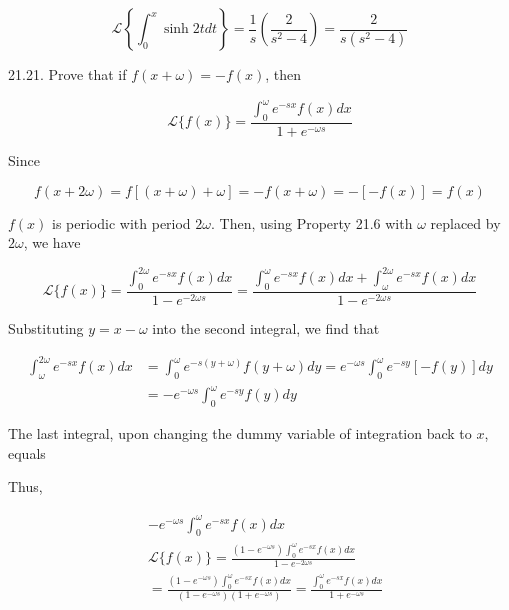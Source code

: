 \documentclass[10pt]{article}
\begin{document}
$$
\mathscr{L}\left\{\int_{0}^{x} \sinh 2 t d t\right\}=\frac{1}{s}\left(\frac{2}{s^{2}-4}\right)=\frac{2}{s\left(s^{2}-4\right)}
$$

21.21. Prove that if $f(x+\omega)=-f(x)$, then


\begin{equation*}
\mathscr{L}\{f(x)\}=\frac{\int_{0}^{\omega} e^{-s x} f(x) d x}{1+e^{-\omega s}} \tag{1}
\end{equation*}


Since

$$
f(x+2 \omega)=f[(x+\omega)+\omega]=-f(x+\omega)=-[-f(x)]=f(x)
$$

$f(x)$ is periodic with period $2 \omega$. Then, using Property 21.6 with $\omega$ replaced by $2 \omega$, we have

$$
\mathscr{L}\{f(x)\}=\frac{\int_{0}^{2 \omega} e^{-s x} f(x) d x}{1-e^{-2 \omega s}}=\frac{\int_{0}^{\omega} e^{-s x} f(x) d x+\int_{\omega}^{2 \omega} e^{-s x} f(x) d x}{1-e^{-2 \omega s}}
$$

Substituting $y=x-\omega$ into the second integral, we find that

$$
\begin{aligned}
\int_{\omega}^{2 \omega} e^{-s x} f(x) d x & =\int_{0}^{\omega} e^{-s(y+\omega)} f(y+\omega) d y=e^{-\omega s} \int_{0}^{\omega} e^{-s y}[-f(y)] d y \\
& =-e^{-\omega s} \int_{0}^{\omega} e^{-s y} f(y) d y
\end{aligned}
$$

The last integral, upon changing the dummy variable of integration back to $x$, equals

Thus,

$$
\begin{aligned}
&-e^{-\omega s} \int_{0}^{\omega} e^{-s x} f(x) d x \\
& \mathscr{L}\{f(x)\}=\frac{\left(1-e^{-\omega s}\right) \int_{0}^{\omega} e^{-s x} f(x) d x}{1-e^{-2 \omega s}} \\
&=\frac{\left(1-e^{-\omega s}\right) \int_{0}^{\omega} e^{-s x} f(x) d x}{\left(1-e^{-\omega s}\right)\left(1+e^{-\omega s}\right)}=\frac{\int_{0}^{\omega} e^{-s x} f(x) d x}{1+e^{-\omega s}}
\end{aligned}
$$
\end{document}
